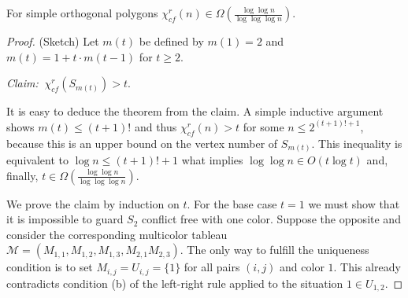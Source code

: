 \documentclass[a4paper,USenglish,numberwithinsect]{lipics}
\theoremstyle{plain}
\begin{document}
\begin{theorem}
\label{r-cf-lowerbound} For simple orthogonal polygons
$\chi_{cf}^r (n) \in
\Omega\left(\frac{\log{\log{n}}}{\log{\log{\log{n}}}}\right)$.
\end{theorem}
\begin{proof}(Sketch)
Let  $m(t)$ be defined by $m(1)=2$ and $m(t)=1+t \cdot
m(t-1)$ for
$t \geq 2$.

\noindent
{\em Claim:}
$ \ \chi_{cf}^r(S_{m(t)}) > t$.


\noindent
It is easy to  deduce the theorem from the claim. A simple inductive
argument shows 
$m(t) \leq (t+1)!$ and thus $\chi_{cf}^r(n) > t$ for some  $n \leq
2^{(t+1)!+1}$,
because this  is an upper bound on the vertex number of   $S_{m(t)}$.
This inequality is equivalent to $\log{n}  \leq (t+1)!+1$ what implies
$\log{\log{n}} \in O(t \log{t})$ and, finally,
$t \in \Omega\left(\frac{\log{\log{n}}}{\log{\log{\log{n}}}}\right)$.  


We prove the claim by induction on $t$. For the base case $t=1$
we must show that it is impossible to guard $S_2$ conflict free with one
color.
Suppose the opposite and consider the corresponding multicolor tableau
$\mathcal{M}=(M_{1,1},M_{1,2},M_{1,3},M_{2,1}M_{2,3})$. The only way to
fulfill
the uniqueness condition is to set $M_{i,j}=U_{i,j}=\{1\}$ for all pairs
$(i,j)$ and color $1$. This already  contradicts  condition
(b) of the
left-right rule applied to the situation $1 \in U_{1,2}$.



\end{proof}
\end{document}
